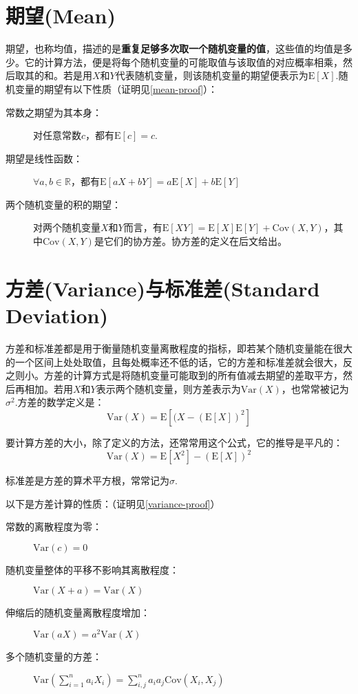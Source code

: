 \documentclass[UTF8]{ctexbook}
\begin{document}
\section{期望(Mean)}
\label{mean}
期望，也称均值，描述的是\textbf{重复足够多次取一个随机变量的值}，这些值的均值是多少。它的计算方法，便是将每个随机变量的可能取值与该取值的对应概率相乘，然后取其的和。若是用$X$和$Y$代表随机变量，则该随机变量的期望便表示为$\mathrm E[X]$.随机变量的期望有以下性质（证明见\ref{mean-proof}）：
\begin{description}
	\item [常数之期望为其本身：]
	对任意常数$c$，都有$\mathrm E[c]=c$.
	\item [期望是线性函数：]
	$\forall a,b\in\mathbb{R}$，都有$\mathrm E[aX+bY]=a\mathrm E[X]+b\mathrm E[Y]$
	\item [两个随机变量的积的期望：]
	对两个随机变量$X$和$Y$而言，有$\mathrm E[XY]=\mathrm E[X]\mathrm E[Y]+\mathrm{Cov}(X,Y)$，其中$\mathrm{Cov}(X,Y)$是它们的协方差。协方差的定义在后文给出。
\end{description}

\section{方差(Variance)与标准差(Standard Deviation)}
\label{var-sd}
方差和标准差都是用于衡量随机变量离散程度的指标，即若某个随机变量能在很大的一个区间上处处取值，且每处概率还不低的话，它的方差和标准差就会很大，反之则小。方差的计算方式是将随机变量可能取到的所有值减去期望的差取平方，然后再相加。若用$X$和$Y$表示两个随机变量，则方差表示为$\mathrm{Var}(X)$，也常常被记为$\sigma^2$.方差的数学定义是：
\[
	\mathrm{Var}(X)=\mathrm E[(X-(\mathrm E[X])^2]
\]

要计算方差的大小，除了定义的方法，还常常用这个公式，它的推导是平凡的：
\[
    \mathrm{Var}(X)=\mathrm E[X^2]-\left(\mathrm{E}[X]\right)^2
\]

标准差是方差的算术平方根，常常记为$\sigma$.

以下是方差计算的性质：（证明见\ref{variance-proof}）
\begin{description}
	\item [常数的离散程度为零：]
	$\mathrm{Var}(c)=0$
	\item [随机变量整体的平移不影响其离散程度：]
	$\mathrm{Var}(X+a)=\mathrm{Var}(X)$
	\item [伸缩后的随机变量离散程度增加：]
	$\mathrm{Var}(aX)=a^2\mathrm{Var}(X)$
	\item [多个随机变量的方差：]
	$\mathrm{Var}\left(\sum_{i=1}^na_iX_i\right)=\sum_{i,j}^na_ia_j\mathrm{Cov}(X_i,X_j)$
\end{description}
\end{document}
